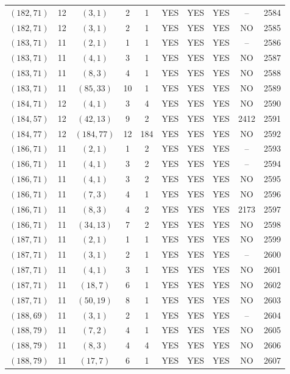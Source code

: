 \begin{longtable}{|c|c|c|c|c|c|c|c|c|c|}
$(182, 71)$ & 12 & $(3, 1)$ & 2 & 1 & YES & YES & YES & -- & 2584\\
$(182, 71)$ & 12 & $(3, 1)$ & 2 & 1 & YES & YES & YES & NO & 2585\\
$(183, 71)$ & 11 & $(2, 1)$ & 1 & 1 & YES & YES & YES & -- & 2586\\
$(183, 71)$ & 11 & $(4, 1)$ & 3 & 1 & YES & YES & YES & NO & 2587\\
$(183, 71)$ & 11 & $(8, 3)$ & 4 & 1 & YES & YES & YES & NO & 2588\\
$(183, 71)$ & 11 & $(85, 33)$ & 10 & 1 & YES & YES & YES & NO & 2589\\
$(184, 71)$ & 12 & $(4, 1)$ & 3 & 4 & YES & YES & YES & NO & 2590\\
$(184, 57)$ & 12 & $(42, 13)$ & 9 & 2 & YES & YES & YES & 2412 & 2591\\
$(184, 77)$ & 12 & $(184, 77)$ & 12 & 184 & YES & YES & YES & NO & 2592\\
$(186, 71)$ & 11 & $(2, 1)$ & 1 & 2 & YES & YES & YES & -- & 2593\\
$(186, 71)$ & 11 & $(4, 1)$ & 3 & 2 & YES & YES & YES & -- & 2594\\
$(186, 71)$ & 11 & $(4, 1)$ & 3 & 2 & YES & YES & YES & NO & 2595\\
$(186, 71)$ & 11 & $(7, 3)$ & 4 & 1 & YES & YES & YES & NO & 2596\\
$(186, 71)$ & 11 & $(8, 3)$ & 4 & 2 & YES & YES & YES & 2173 & 2597\\
$(186, 71)$ & 11 & $(34, 13)$ & 7 & 2 & YES & YES & YES & NO & 2598\\
$(187, 71)$ & 11 & $(2, 1)$ & 1 & 1 & YES & YES & YES & NO & 2599\\
$(187, 71)$ & 11 & $(3, 1)$ & 2 & 1 & YES & YES & YES & -- & 2600\\
$(187, 71)$ & 11 & $(4, 1)$ & 3 & 1 & YES & YES & YES & NO & 2601\\
$(187, 71)$ & 11 & $(18, 7)$ & 6 & 1 & YES & YES & YES & NO & 2602\\
$(187, 71)$ & 11 & $(50, 19)$ & 8 & 1 & YES & YES & YES & NO & 2603\\
$(188, 69)$ & 11 & $(3, 1)$ & 2 & 1 & YES & YES & YES & -- & 2604\\
$(188, 79)$ & 11 & $(7, 2)$ & 4 & 1 & YES & YES & YES & NO & 2605\\
$(188, 79)$ & 11 & $(8, 3)$ & 4 & 4 & YES & YES & YES & NO & 2606\\
$(188, 79)$ & 11 & $(17, 7)$ & 6 & 1 & YES & YES & YES & NO & 2607\\

\end{longtable}
